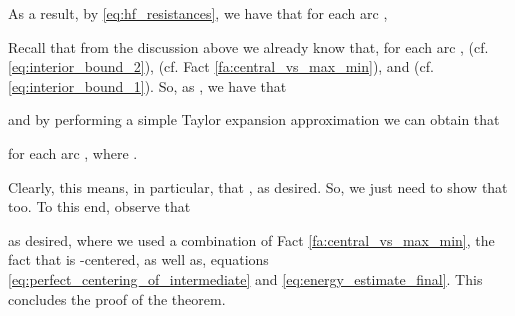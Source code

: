 \documentclass[11pt, letterpaper]{article}
\begin{document}
As a result, by \eqref{eq:hf_resistances}, we have that for each arc ,


Recall that from the discussion above we already know that, for each arc ,   (cf. \eqref{eq:interior_bound_2}),  (cf. Fact \ref{fa:central_vs_max_min}), and  (cf. \eqref{eq:interior_bound_1}). So, as , we have that 

and by performing a simple Taylor expansion approximation we can obtain that 

for each arc , where . 

Clearly, this means, in particular, that , as desired. So, we just need to show that  too. To this end, observe that

as desired, where we used a combination of Fact \ref{fa:central_vs_max_min}, the fact that  is -centered, as well as, equations \eqref{eq:perfect_centering_of_intermediate} and  \eqref{eq:energy_estimate_final}.
This concludes the proof of the theorem. 
\end{document}
